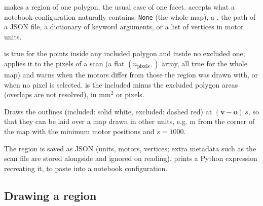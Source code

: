  makes a region of one polygon, the usual case of one facet. 
accepts what a notebook configuration naturally contains: \texttt{None} (the whole map), a
, the path of a JSON file, a dictionary of keyword arguments, or a list of
vertices in motor units.

 is true for the points inside any included polygon and inside no excluded one;
 applies it to the pixels of a scan (a flat $(n_\mathrm{pixels},)$ array, all
true for the whole map) and warns when the motors differ from those the region was drawn with,
or when no pixel is selected.  is the included minus the excluded polygon areas
(overlaps are not resolved), in mm$^2$ or pixels.

Draws the outlines (included: solid white, excluded: dashed red) at
$(\mathbf v - \mathbf o)\,s$, so that they can be laid over a map drawn in other units, e.g.
\textmu m from the corner of the map with  the minimum motor positions and
$s = 1000$.

The region is saved as JSON (units, motors, vertices; extra metadata such as the scan file are
stored alongside and ignored on reading).  prints a Python expression recreating
it, to paste into a notebook configuration.

\subsection{Drawing a region}

